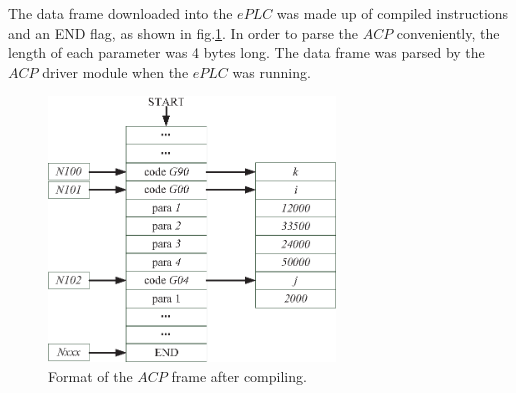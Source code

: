 \documentclass[journal]{IEEEtran}
\begin{document}
The data frame downloaded into the $ePLC$ was made up of compiled instructions and an END flag, as shown in fig.\ref{fig:formatofACPprogram}. In order to parse the $ACP$ conveniently, the length of each parameter was 4 bytes long. The data frame was parsed by the $ACP$ driver module when the $ePLC$ was running.

\begin{figure}
\centering
\includegraphics[width=3in]{fig/FIG8_TII-18-0024.eps}
\caption{Format of the $ACP$ frame after compiling.}
\label{fig:formatofACPprogram}
\end{figure}
\end{document}
